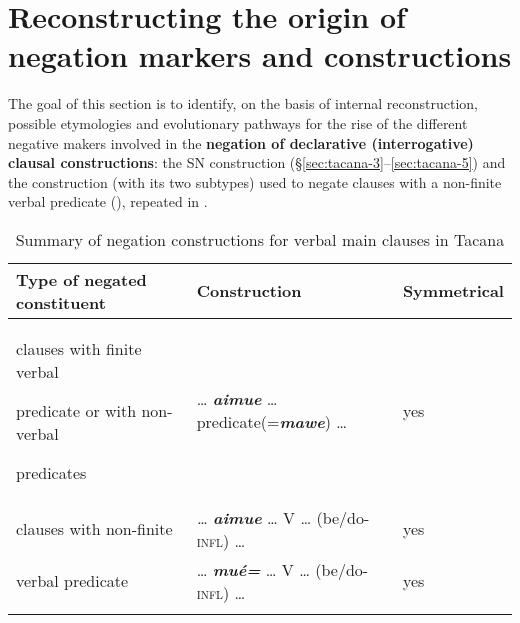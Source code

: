 \documentclass[output=paper]{langsci/langscibook}
\begin{document}
\section{Reconstructing the origin of negation markers and constructions}
\label{sec:tacana-10}

The goal of this section is to identify, on the basis of internal
reconstruction, possible etymologies and evolutionary pathways for the rise
of the different negative makers involved in the \textbf{negation of
declarative (interrogative) clausal constructions}: the SN construction
(§\ref{sec:tacana-3}--\ref{sec:tacana-5}) and the construction (with its
two subtypes) used to negate clauses with a non-finite verbal predicate
(), repeated in .

\begin{table}\begin{small}
\caption{Summary of negation constructions for verbal main clauses in Tacana}\label{tab:tacana-3}
\begin{tabularx}{\textwidth}{Qll}
\lsptoprule
Type of negated constituent & Construction & Symmetrical\\\midrule
clauses with finite verbal\newline \rule{0pt}{1ex}\hspace{2ex}predicate or with
non-verbal\newline \rule{0pt}{1ex}\hspace{2ex}predicates & … \textbf{\textit{aimue}} … predicate(=\textbf{\textit{mawe}}) … & yes\\
clauses with non-finite & \textit{…}
\textbf{\textit{aimue}} … V … (be/do-\textsc{infl}) … & yes \\
\hspace{2ex}verbal predicate & … \textbf{\textit{mué=}} … V … (be/do-\textsc{infl}) … & yes\\
\lspbottomrule
\end{tabularx}\end{small}\end{table}
\end{document}
